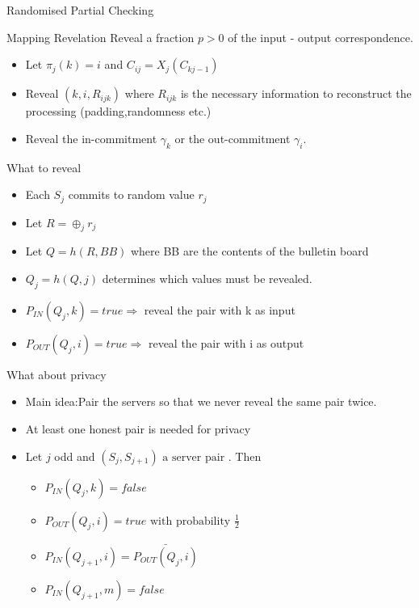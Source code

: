\documentclass{beamer}
\begin{document}
\begin{frame}[allowframebreaks]{Randomised Partial Checking \cite{JJR02}}
\begin{block}{Mapping Revelation}
Reveal a fraction $p > 0$ of the input - output correspondence.
\begin{itemize}
\item Let $\pi_j(k) = i$ and $C_{ij} = X_j(C_{kj-1})$
\item Reveal $(k,i,R_{ijk})$ where $R_{ijk}$ is the necessary information to reconstruct the processing (padding,randomness etc.)
\item Reveal the in-commitment $\gamma_k$ or the out-commitment $\gamma_i$.
\end{itemize}
\end{block}

\begin{block}{What to reveal}
\begin{itemize}
\item Each $S_j$ commits to random value $r_j$
\item Let $R=\oplus_jr_j$
\item Let $Q=h(R,BB)$ where BB are the contents of the bulletin board
\item $Q_j = h(Q,j)$ determines which values must be revealed.
\item $P_{IN}(Q_j,k)=true \Rightarrow$ reveal the pair with k as input
\item $P_{OUT}(Q_j,i)=true \Rightarrow$ reveal the pair with i as output
\end{itemize}
\end{block}

\begin{block}{What about privacy}
\begin{itemize}
\item Main idea:Pair the servers so that we never reveal the same pair twice.
\item At least one honest pair is needed for privacy
\item Let $j$ odd and $(S_j,S_{j+1}) \text{ a server pair }$. Then
\begin{itemize}
\item $P_{IN}(Q_j,k)=false$
\item $P_{OUT}(Q_j,i)=true \text{ with probability } \frac{1}{2}$
\item $P_{IN}(Q_{j+1},i)=\bar{P_{OUT}(Q_j,i)}$
\item $P_{IN}(Q_{j+1},m)=false$
\end{itemize}
\end{itemize}
\end{block}


\end{frame}
\end{document}
